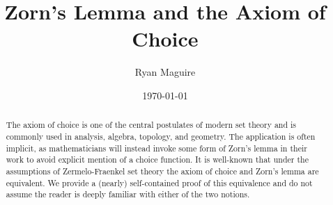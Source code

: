 \documentclass{article}
\title{Zorn's Lemma and the Axiom of Choice}
\author{Ryan Maguire}
\date{\today}
\theoremstyle{definition}
\begin{document}
    \maketitle
    \begin{abstract}
        The axiom of choice is one of the central postulates of modern
        set theory and is commonly used in analysis, algebra, topology,
        and geometry. The application is often implicit, as mathematicians
        will instead invoke some form of Zorn's lemma in their work to avoid
        explicit mention of a choice function. It is well-known that under the
        assumptions of Zermelo-Fraenkel set theory the axiom of choice and
        Zorn's lemma are equivalent. We provide a (nearly) self-contained proof
        of this equivalence and do not assume the reader is deeply familiar
        with either of the two notions.
    \end{abstract}
    \tableofcontents
\end{document}
